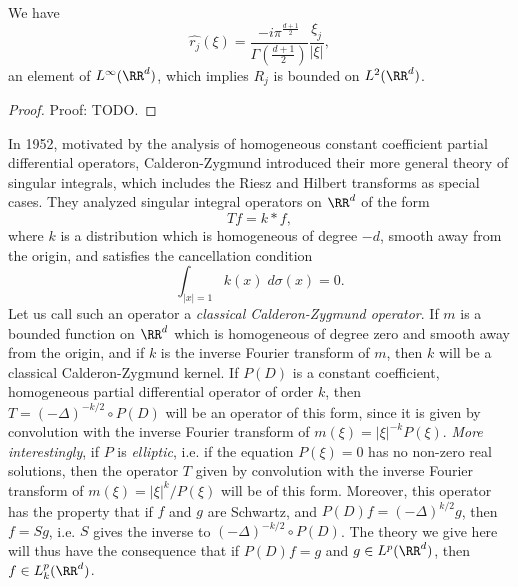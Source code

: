 \begin{lemma}
    We have
    \[ \widehat{r_j}(\xi) = \frac{-i \pi^{\frac{d+1}{2}}}{\Gamma \left( \frac{d+1}{2} \right)} \frac{\xi_j}{|\xi|}, \]
    an element of $L^\infty(\RR^d)$, which implies $R_j$ is bounded on $L^2(\RR^d)$.
\end{lemma}
\begin{proof}
    Proof: TODO.
\end{proof}

In 1952, motivated by the analysis of homogeneous constant coefficient partial differential operators, Calderon-Zygmund introduced their more general theory of singular integrals, which includes the Riesz and Hilbert transforms as special cases. They analyzed singular integral operators on $\RR^d$ of the form
%
\[ Tf = k * f, \]
%
where $k$ is a distribution which is homogeneous of degree $-d$, smooth away from the origin, and satisfies the cancellation condition
%
\[ \int_{|x| = 1} k(x)\; d\sigma(x) = 0. \]
%
Let us call such an operator a \emph{classical Calderon-Zygmund operator}. If $m$ is a bounded function on $\RR^d$ which is homogeneous of degree zero and smooth away from the origin, and if $k$ is the inverse Fourier transform of $m$, then $k$ will be a classical Calderon-Zygmund kernel. If $P(D)$ is a constant coefficient, homogeneous partial differential operator of order $k$, then $T = (-\Delta)^{-k/2} \circ P(D)$ will be an operator of this form, since it is given by convolution with the inverse Fourier transform of $m(\xi) = |\xi|^{-k} P(\xi)$. \emph{More interestingly}, if $P$ is \emph{elliptic}, i.e. if the equation $P(\xi) = 0$ has no non-zero real solutions, then the operator $T$ given by convolution with the inverse Fourier transform of $m(\xi) = |\xi|^k / P(\xi)$ will be of this form. Moreover, this operator has the property that if $f$ and $g$ are Schwartz, and $P(D) f = (-\Delta)^{k/2} g$, then $f = S g$, i.e. $S$ gives the inverse to $(-\Delta)^{-k/2} \circ P(D)$. The theory we give here will thus have the consequence that if $P(D) f = g$ and $g \in L^p(\RR^d)$, then $f \in L^p_k(\RR^d)$.

